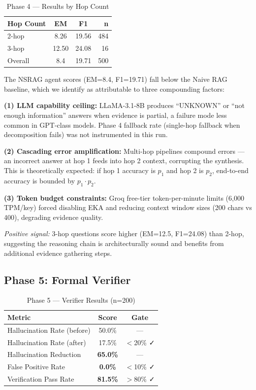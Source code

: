 \documentclass[conference]{IEEEtran}
\begin{document}
\begin{table}[h]
\centering
\caption{Phase 4 — Results by Hop Count}
\label{tab:phase4_hops}
\begin{tabular}{lccr}
\toprule
\textbf{Hop Count} & \textbf{EM} & \textbf{F1} & \textbf{n} \\
\midrule
2-hop & 8.26 & 19.56 & 484 \\
3-hop & 12.50 & 24.08 & 16 \\
\midrule
Overall & 8.4 & 19.71 & 500 \\
\bottomrule
\end{tabular}
\end{table}

The NSRAG agent scores (EM=8.4, F1=19.71) fall below the Naive RAG baseline, which we identify as attributable to three compounding factors:

\textbf{(1) LLM capability ceiling:} LLaMA-3.1-8B produces ``UNKNOWN'' or ``not enough information'' answers when evidence is partial, a failure mode less common in GPT-class models. Phase 4 fallback rate (single-hop fallback when decomposition fails) was not instrumented in this run.

\textbf{(2) Cascading error amplification:} Multi-hop pipelines compound errors — an incorrect answer at hop 1 feeds into hop 2 context, corrupting the synthesis. This is theoretically expected: if hop 1 accuracy is $p_1$ and hop 2 is $p_2$, end-to-end accuracy is bounded by $p_1 \cdot p_2$.

\textbf{(3) Token budget constraints:} Groq free-tier token-per-minute limits (6,000 TPM/key) forced disabling EKA and reducing context window sizes (200 chars vs 400), degrading evidence quality.

\textit{Positive signal:} 3-hop questions score higher (EM=12.5, F1=24.08) than 2-hop, suggesting the reasoning chain is architecturally sound and benefits from additional evidence gathering steps.

\subsection{Phase 5: Formal Verifier}

\begin{table}[h]
\centering
\caption{Phase 5 — Verifier Results (n=200)}
\label{tab:phase5}
\begin{tabular}{lcc}
\toprule
\textbf{Metric} & \textbf{Score} & \textbf{Gate} \\
\midrule
Hallucination Rate (before) & 50.0\% & — \\
Hallucination Rate (after) & 17.5\% & $<$20\% ✓ \\
Hallucination Reduction & \textbf{65.0\%} & — \\
False Positive Rate & \textbf{0.0\%} & $<$10\% ✓ \\
Verification Pass Rate & \textbf{81.5\%} & $>$80\% ✓ \\
\bottomrule
\end{tabular}
\end{table}
\end{document}
